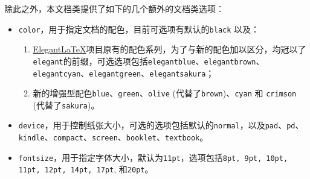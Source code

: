 除此之外，本文档类提供了如下的几个额外的文档类选项：

\begin{itemize}
    \item \texttt{color}，用于指定文档的配色，目前可选项有默认的\texttt{black} 以及：
    \begin{enumerate}
        \item \href{https://github.com/ElegantLaTeX/}{Elegant\LaTeX}项目原有的配色系列，为了与新的配色加以区分，均冠以了\texttt{elegant}的前缀，可选选项包括\texttt{elegantblue}、\texttt{elegantbrown}、\texttt{elegantcyan}、\texttt{elegantgreen}、\texttt{elegantsakura}；
        \item 新的增强型配色\texttt{blue}、\texttt{green}、\texttt{olive} (代替了\texttt{brown})、\texttt{cyan} 和 \texttt{crimson} (代替了\texttt{sakura})。
    \end{enumerate}
    \item \texttt{device}，用于控制纸张大小，可选的选项包括默认的\texttt{normal}，以及\texttt{pad}、\texttt{pd}、\texttt{kindle}、\texttt{compact}、\texttt{screen}、\texttt{booklet}、\texttt{textbook}。
    \item \texttt{fontsize}，用于指定字体大小，默认为\texttt{11pt}，选项包括\texttt{8pt, 9pt, 10pt, 11pt, 12pt, 14pt, 17pt}, 和\texttt{20pt}。
\end{itemize}
